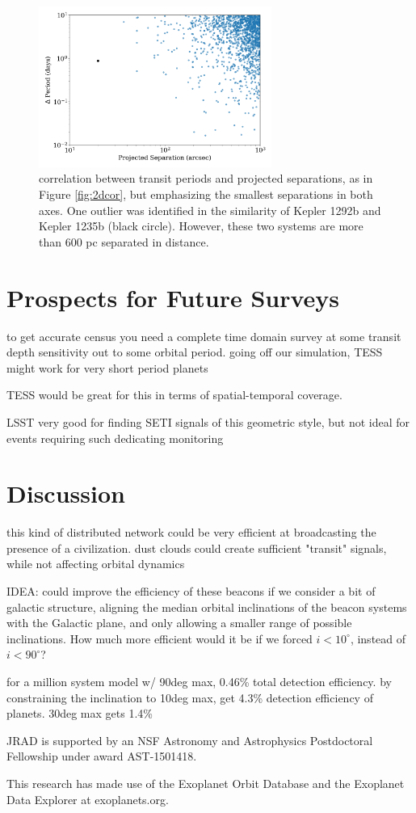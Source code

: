 \documentclass[modern]{aastex62}
\begin{document}
\begin{figure}[]
\centering
\includegraphics[width=3in]{../figures/delta_per2.png}
\caption{correlation between transit periods and projected separations, as in Figure \ref{fig:2dcor}, but emphasizing the smallest separations in both axes. One outlier was identified in the similarity of Kepler 1292b and Kepler 1235b (black circle). However, these two systems are more than 600 pc separated in distance.}
\label{fig:2dcor2}
\end{figure}



\section{Prospects for Future Surveys}

to get accurate census you need a complete time domain survey at some transit depth sensitivity out to some orbital period. going off our simulation, TESS might work for very short period planets

TESS would be great for this in terms of spatial-temporal coverage. 

LSST very good for finding SETI signals of this geometric style, but not ideal for events requiring such dedicating monitoring


\section{Discussion}
this kind of distributed network could be very efficient at broadcasting the presence of a civilization. dust clouds could create sufficient "transit" signals, while not affecting orbital dynamics


IDEA:
could improve the efficiency of these beacons if we consider a bit of galactic structure, aligning the median orbital inclinations of the beacon systems with the Galactic plane, and only allowing a smaller range of possible inclinations. How much more efficient would it be if we forced $i<10^\circ$, instead of $i<90^\circ$?

for a million system model w/ 90deg max, 0.46\% total detection efficiency. 
by constraining the inclination to 10deg max, get 4.3\% detection efficiency of planets. 30deg max gets 1.4\%

\acknowledgments
JRAD is supported by an NSF Astronomy and Astrophysics Postdoctoral Fellowship under award AST-1501418.

This research has made use of the Exoplanet Orbit Database and the Exoplanet Data Explorer at exoplanets.org.


\end{document}
